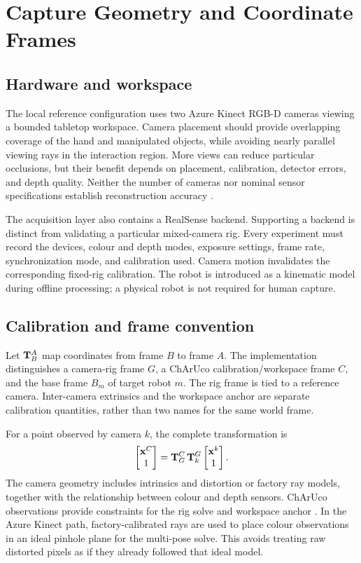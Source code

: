 \section{Capture Geometry and Coordinate Frames}
\label{sec:hardware}

\subsection{Hardware and workspace}

The local reference configuration uses two Azure Kinect RGB-D cameras
viewing a bounded tabletop workspace. Camera placement should provide
overlapping coverage of the hand and manipulated objects, while avoiding
nearly parallel viewing rays in the interaction region. More views can
reduce particular occlusions, but their benefit depends on placement,
calibration, detector errors, and depth quality. Neither the number of
cameras nor nominal sensor specifications establish reconstruction accuracy
\cite{mskinect,tolgyessy,bulee}.

The acquisition layer also contains a RealSense backend. Supporting a
backend is distinct from validating a particular mixed-camera rig. Every
experiment must record the devices, colour and depth modes, exposure
settings, frame rate, synchronization mode, and calibration used. Camera
motion invalidates the corresponding fixed-rig calibration. The robot is
introduced as a kinematic model during offline processing; a physical robot
is not required for human capture.

\subsection{Calibration and frame convention}
\label{sec:calib}

Let $\mathbf{T}^A_B$ map coordinates from frame $B$ to frame $A$.
The implementation distinguishes a camera-rig frame $G$, a ChArUco
calibration/workspace frame $C$, and the base frame $B_m$ of target robot
$m$. The rig frame is tied to a reference camera. Inter-camera extrinsics
and the workspace anchor are separate calibration quantities, rather than
two names for the same world frame.

For a point observed by camera $k$, the complete transformation is
\begin{equation}
  \begin{bmatrix}\mathbf{x}^C\\1\end{bmatrix}
  = \mathbf{T}^C_G\,\mathbf{T}^G_k
    \begin{bmatrix}\mathbf{x}^k\\1\end{bmatrix}.
  \label{eq:extrinsic}
\end{equation}
The camera geometry includes intrinsics and distortion or factory ray
models, together with the relationship between colour and depth sensors.
ChArUco observations provide constraints for the rig solve and workspace
anchor \cite{opencvcharuco}. In the Azure Kinect path, factory-calibrated
rays are used to place colour observations in an ideal pinhole plane for
the multi-pose solve. This avoids treating raw distorted pixels as if they
already followed that ideal model.

